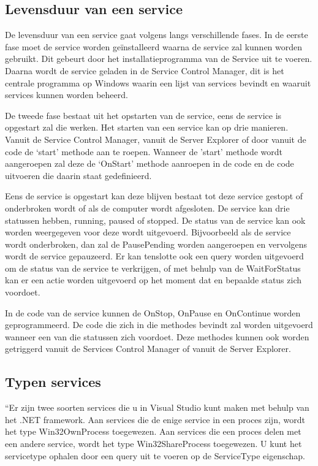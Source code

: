 \subsection{Levensduur van een service}
De levensduur van een service gaat volgens \textcite{DevMozService} langs verschillende fases. In de eerste fase moet de service worden geïnstalleerd waarna de service zal kunnen worden gebruikt. Dit gebeurt door het installatieprogramma van de Service uit te voeren. Daarna wordt de service geladen in de Service Control Manager, dit is het centrale programma op Windows waarin een lijst van services bevindt en waaruit services kunnen worden beheerd. 

De tweede fase bestaat uit het opstarten van de service, eens de service is opgestart zal die werken. Het starten van een service kan op drie manieren. Vanuit de Service Control Manager, vanuit de Server Explorer of door vanuit de code de ‘start’ methode aan te roepen. Wanneer de 'start’ methode wordt aangeroepen zal deze de ‘OnStart’ methode aanroepen in de code en de code uitvoeren die daarin staat gedefinieerd. 

Eens de service is opgestart kan deze blijven bestaat tot deze service gestopt of onderbroken wordt of als de computer wordt afgesloten. De service kan drie statussen hebben, running, paused of stopped. De status van de service kan ook worden weergegeven voor deze wordt uitgevoerd. Bijvoorbeeld als de service wordt onderbroken, dan zal de PausePending worden aangeroepen en vervolgens wordt de service gepauzeerd. Er kan tenslotte ook een query worden uitgevoerd om de status van de service te verkrijgen, of met behulp van de WaitForStatus kan er een actie worden uitgevoerd op het moment dat en bepaalde status zich voordoet. 

In de code van de service kunnen de OnStop, OnPause en OnContinue worden geprogrammeerd. De code die zich in die methodes bevindt zal worden uitgevoerd wanneer een van die statussen zich voordoet. Deze methodes kunnen ook worden getriggerd vanuit de Services Control Manager of vanuit de Server Explorer.

\subsection{Typen services}
``Er zijn twee soorten services die u in Visual Studio kunt maken met behulp van het .NET framework. Aan services die de enige service in een proces zijn, wordt het type Win32OwnProcess toegewezen. Aan services die een proces delen met een andere service, wordt het type Win32ShareProcess toegewezen. U kunt het servicetype ophalen door een query uit te voeren op de ServiceType eigenschap. 

